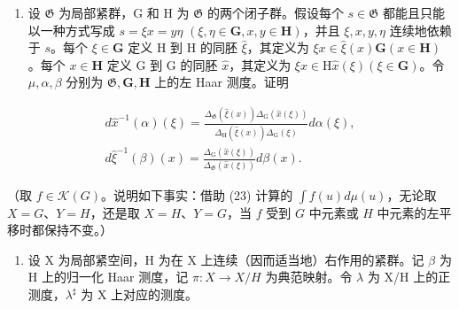 \begin{enumerate}
\def\labelenumi{\arabic{enumi})}
\setcounter{enumi}{7}
\tightlist
\item
  设 \(\mathfrak{G}\) 为局部紧群，G 和 H 为 \(\mathfrak{G}\) 的两个闭子群。假设每个 \(s \in \mathfrak{G}\) 都能且只能以一种方式写成 \(s = \xi x = y\eta\) \((\xi, \eta \in \mathbf{G}, x, y \in \mathbf{H})\)，并且 \(\xi, x, y, \eta\) 连续地依赖于 \(s\)。每个 \(\xi \in \mathbf{G}\) 定义 H 到 H 的同胚 \(\widehat{\xi}\)，其定义为 \(\xi x \in \widehat{\xi}(x)\mathbf{G} (x \in \mathbf{H})\)。每个 \(x \in \mathbf{H}\) 定义 G 到 G 的同胚 \(\widehat{x}\)，其定义为 \(\xi x \in \mathrm{H}\widehat{x}(\xi) (\xi \in \mathbf{G})\)。令 \(\mu, \alpha, \beta\) 分别为 \(\mathfrak{G}, \mathbf{G}, \mathbf{H}\) 上的左 Haar 测度。证明
\end{enumerate}

\[
\begin{array}{c} d \widehat {x} ^ {- 1} (\alpha) (\xi) = \frac {\Delta_ {\mathfrak {G}} (\widehat {\xi} (x)) \Delta_ {\mathrm{G}} (\widehat {x} (\xi))}{\Delta_ {\mathrm{H}} (\widehat {\xi} (x)) \Delta_ {\mathrm{G}} (\xi)} d \alpha (\xi), \\ d \widehat {\xi} ^ {- 1} (\beta) (x) = \frac {\Delta_ {\mathrm{G}} (\widehat {x} (\xi))}{\Delta_ {\mathfrak {G}} (\widehat {x} (\xi))} d \beta (x). \end{array}
\]

（取 \(f \in \mathcal{K}(G)\)。说明如下事实：借助 (23) 计算的 \(\int f(u) d\mu(u)\)，无论取 \(X = G\)、\(Y = H\)，还是取 \(X = H\)、\(Y = G\)，当 \(f\) 受到 \(G\) 中元素或 \(H\) 中元素的左平移时都保持不变。）

\begin{enumerate}
\def\labelenumi{\arabic{enumi})}
\setcounter{enumi}{8}
\tightlist
\item
  设 X 为局部紧空间，H 为在 X 上连续（因而适当地）右作用的紧群。记 \(\beta\) 为 H 上的归一化 Haar 测度，记 \(\pi: X \to X/H\) 为典范映射。令 \(\lambda\) 为 X/H 上的正测度，\(\lambda^{\sharp}\) 为 X 上对应的测度。
\end{enumerate}

